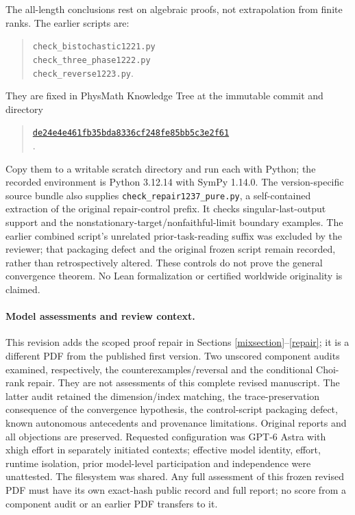 \documentclass[11pt,a4paper]{article}
\begin{document}
The all-length conclusions rest on algebraic proofs, not extrapolation from finite ranks. The earlier scripts are:
\begin{quote}\small
\texttt{check\_bistochastic1221.py}\\
\texttt{check\_three\_phase1222.py}\\
\texttt{check\_reverse1223.py}.
\end{quote}
They are fixed in PhysMath Knowledge Tree at the immutable commit and directory
\begin{quote}\small
\href{https://github.com/lluiseriksson/physmath-knowledge-tree/commit/de24e4e461fb35bda8336cf248fe85bb5c3e2f61}{\texttt{de24e4e461fb35bda8336cf248fe85bb5c3e2f61}}\\
.
\end{quote}
Copy them to a writable scratch directory and run each with Python; the recorded environment is Python 3.12.14 with SymPy 1.14.0. The version-specific source bundle also supplies \texttt{check\_repair1237\_pure.py}, a self-contained extraction of the original repair-control prefix. It checks singular-last-output support and the nonstationary-target/nonfaithful-limit boundary examples. The earlier combined script's unrelated prior-task-reading suffix was excluded by the reviewer; that packaging defect and the original frozen script remain recorded, rather than retrospectively altered. These controls do not prove the general convergence theorem. No Lean formalization or certified worldwide originality is claimed.

\paragraph{Model assessments and review context.}
This revision adds the scoped proof repair in Sections \ref{mixsection}--\ref{repair}; it is a different PDF from the published first version. Two unscored component audits examined, respectively, the counterexamples/reversal and the conditional Choi-rank repair. They are not assessments of this complete revised manuscript. The latter audit retained the dimension/index matching, the trace-preservation consequence of the convergence hypothesis, the control-script packaging defect, known autonomous antecedents and provenance limitations. Original reports and all objections are preserved. Requested configuration was GPT-6 Astra with xhigh effort in separately initiated contexts; effective model identity, effort, runtime isolation, prior model-level participation and independence were unattested. The filesystem was shared. Any full assessment of this frozen revised PDF must have its own exact-hash public record and full report; no score from a component audit or an earlier PDF transfers to it.
\end{document}
